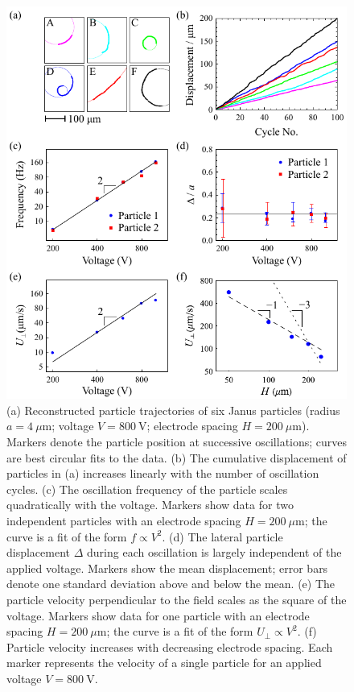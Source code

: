 \begin{figure}[p]
\centering
\includegraphics[width=11.2cm]{figures/2_2.pdf}
\caption{(a) Reconstructed particle trajectories of six Janus particles (radius $a = 4~\mu\text{m}$; voltage $V=800~\text{V}$; electrode spacing $H=200~\mu\text{m}$).  Markers denote the particle position at successive oscillations; curves are best circular fits to the data. (b) The cumulative displacement of particles in (a) increases linearly with the number of oscillation cycles. (c) The oscillation frequency of the particle scales quadratically with the voltage.  Markers show data for two independent particles with an electrode spacing $H=200~\mu\text{m}$; the curve is a fit of the form $f\propto V^2$. (d) The lateral particle  displacement $\Delta$ during each oscillation is largely independent of the applied voltage. Markers show the mean displacement; error bars denote one standard deviation above and below the mean. (e) The particle velocity perpendicular to the field scales as the square of the voltage. Markers show data for one particle with an electrode spacing $H=200~\mu\text{m}$; the curve is a fit of the form $U_{\perp}\propto V^2$. (f) Particle velocity increases with decreasing electrode spacing. Each marker represents the velocity of a single particle for an applied voltage $V=800~\text{V}$.}
\label{fig:2}
\end{figure}

